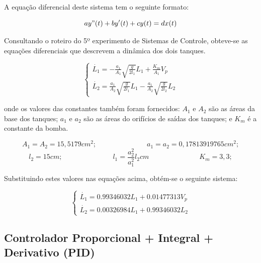 \documentclass[a4paper,12pt]{article}
\begin{document}
A equação diferencial deste sistema tem o seguinte formato:

\begin{equation} \label{Equação diferencial de segunda ordem}
ay"(t) + by'(t) + cy(t) = dx(t)
\end{equation}
\label{Equação diferencial de segunda ordem}

Consultando o roteiro do 5º experimento de Sistemas de Controle, obteve-se as equações diferenciais que descrevem a dinâmica dos dois tanques.

 \begin{equation} \label{EDOs dos níveis dos tanques}
\begin{cases}
\dot{L_1} = -\frac{a_1}{A_1}\sqrt{\frac{g}{2l_1}}L_1 + \frac{K_m}{A_1}V_p \\
\dot{L_2} = \frac{a_1}{A_2}\sqrt{\frac{g}{2l_1}}L_1 - \frac{a_1}{A_2}\sqrt{\frac{g}{2l_2}}L_2
\end{cases}
 \end{equation}
\label{EDOs dos níveis dos tanques}

onde os valores das constantes também foram fornecidos: $A_1$ e $A_2$ são as áreas da base dos tanques; $a_1$ e $a_2$ são as áreas do orifícios de saídas dos tanques; e $K_m$ é a constante da bomba.

\[A_1 = A_2 = 15,5179cm^2; \hspace{3cm}a_1 = a_2 = 0,17813919765cm^2;\]
\[l_2 = 15cm; \hspace{3cm}l_1 = \frac{a^2_2}{a^2_1}l_2cm \hspace{3cm} K_m = 3,3;\]

Substituindo estes valores nas equações acima, obtém-se o seguinte sistema:

 \begin{equation} \label{Equações dos tanques}
\begin{cases}
\dot{L_1} = 0.99346032L_1 + 0.01477313V_p \\
\dot{L_2} = 0.00326984L_1 + 0.99346032L_2
\end{cases}
 \end{equation}
\label{Equações dos tanques}


\subsection{Controlador Proporcional + Integral + Derivativo (PID)}
\end{document}
